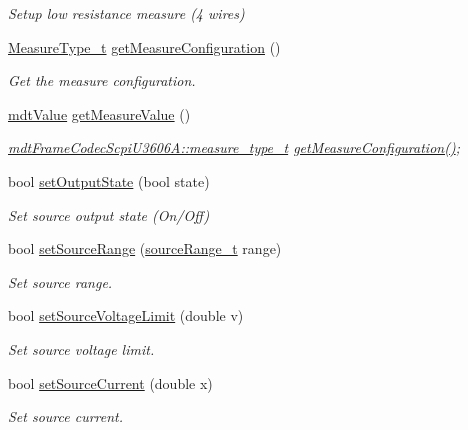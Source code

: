 \begin{DoxyCompactItemize}
\begin{DoxyCompactList}\small\item\em Setup low resistance measure (4 wires) \end{DoxyCompactList}\item 
\hyperlink{classmdt_device_u3606_a_a75dc9c6f4c68da0106a6be067fd658b7}{Measure\-Type\-\_\-t} \hyperlink{classmdt_device_u3606_a_ad1261494c005f000b982999f2a5965aa}{get\-Measure\-Configuration} ()
\begin{DoxyCompactList}\small\item\em Get the measure configuration. \end{DoxyCompactList}\item 
\hyperlink{classmdt_value}{mdt\-Value} \hyperlink{classmdt_device_u3606_a_ae75a1a896f905487d080761a2b8cf5a5}{get\-Measure\-Value} ()
\begin{DoxyCompactList}\small\item\em \hyperlink{classmdt_frame_codec_scpi_u3606_a_a3d7a1de14d77797a08e3d2991fa9f004}{mdt\-Frame\-Codec\-Scpi\-U3606\-A\-::measure\-\_\-type\-\_\-t} \hyperlink{classmdt_device_u3606_a_ad1261494c005f000b982999f2a5965aa}{get\-Measure\-Configuration()}; \end{DoxyCompactList}\item 
bool \hyperlink{classmdt_device_u3606_a_abdecce2f61926be3acffbd96aa83c497}{set\-Output\-State} (bool state)
\begin{DoxyCompactList}\small\item\em Set source output state (On/\-Off) \end{DoxyCompactList}\item 
bool \hyperlink{classmdt_device_u3606_a_abf5a2f29f4dad383ad03f33c9bc295bd}{set\-Source\-Range} (\hyperlink{classmdt_device_u3606_a_af53b326fef5d9e32a0149839b4319b1e}{source\-Range\-\_\-t} range)
\begin{DoxyCompactList}\small\item\em Set source range. \end{DoxyCompactList}\item 
bool \hyperlink{classmdt_device_u3606_a_a333740f79b57dd1d9135d0fa590d2680}{set\-Source\-Voltage\-Limit} (double v)
\begin{DoxyCompactList}\small\item\em Set source voltage limit. \end{DoxyCompactList}\item 
bool \hyperlink{classmdt_device_u3606_a_acee48f6f2fff3ba8b727b790b1ab65bf}{set\-Source\-Current} (double x)
\begin{DoxyCompactList}\small\item\em Set source current. \end{DoxyCompactList}\end{DoxyCompactItemize}
